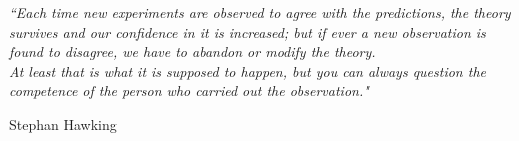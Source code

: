 \documentclass[12pt, twoside]{Thesis}
\begin{document}
\textit{``Each time new experiments are observed to agree with the predictions, the theory survives and our confidence in it is increased; but if ever a new observation is found to disagree, we have to abandon or modify the theory. \\ At least that is what it is supposed to happen, but you can always question the competence of the person who carried out the observation."}

\begin{flushright}
Stephan Hawking
\end{flushright}

\vfill\vfill\vfill\vfill\vfill\vfill\null %

\clearpage %


\end{document}
